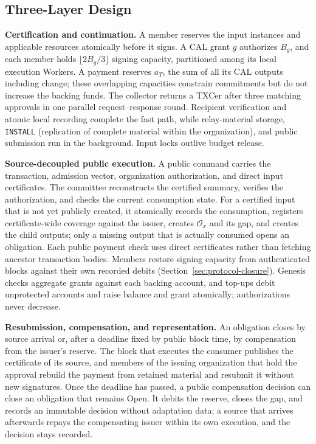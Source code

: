 \subsection{Three-Layer Design}
\label{sec:model-layers}
\noindent\textbf{Certification and continuation.}
A member reserves the input instances and applicable resources atomically before it signs. A CAL grant $g$ authorizes $B_g$, and each member holds $\lfloor2B_g/3\rfloor$ signing capacity, partitioned among its local execution Workers. A payment reserves $a_T$, the sum of all its CAL outputs including change; these overlapping capacities constrain commitments but do not increase the backing funds. The collector returns a TXCer after three matching approvals in one parallel request--response round. Recipient verification and atomic local recording complete the fast path, while relay-material storage, \texttt{INSTALL} (replication of complete material within the organization), and public submission run in the background. Input locks outlive budget release.

\noindent\textbf{Source-decoupled public execution.}
A public command carries the transaction, admission vector, organization authorization, and direct input certificates. The committee reconstructs the certified summary, verifies the authorization, and checks the current consumption state. For a certified input that is not yet publicly created, it atomically records the consumption, registers certificate-wide coverage against the issuer, creates $\mathcal O_x$ and its gap, and creates the child outputs; only a missing output that is actually consumed opens an obligation. Each public payment check uses direct certificates rather than fetching ancestor transaction bodies. Members restore signing capacity from authenticated blocks against their own recorded debits (Section~\ref{sec:protocol-closure}). Genesis checks aggregate grants against each backing account, and top-ups debit unprotected accounts and raise balance and grant atomically; authorizations never decrease.

\noindent\textbf{Resubmission, compensation, and representation.}
An obligation closes by source arrival or, after a deadline fixed by public block time, by compensation from the issuer's reserve. The block that executes the consumer publishes the certificate of its source, and members of the issuing organization that hold the approval rebuild the payment from retained material and resubmit it without new signatures. Once the deadline has passed, a public compensation decision can close an obligation that remains Open. It debits the reserve, closes the gap, and records an immutable decision without adaptation data; a source that arrives afterwards repays the compensating issuer within its own execution, and the decision stays recorded.

